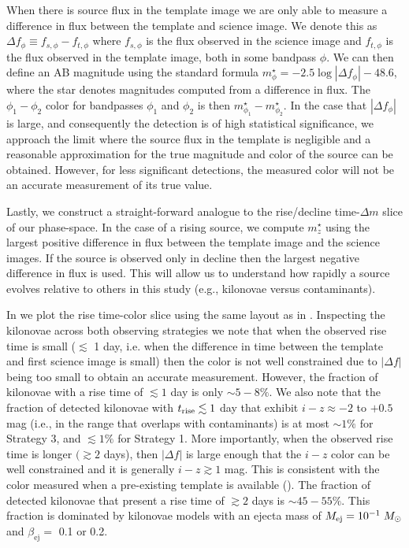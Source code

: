 \clearpage
When there is source flux in the template image we are only able to measure a difference in flux between the template and science image. We denote this as $\Delta f_{\phi} \equiv f_{s,\phi} - f_{t,\phi}$ where $f_{s,\phi}$ is the flux observed in the science image and $f_{t,\phi}$ is the flux observed in the template image, both in some bandpass $\phi$. We can then define an AB magnitude using the standard formula $m^{\star}_{\phi} = -2.5\log{|\Delta f_{\phi}|}-48.6$, where the star denotes magnitudes computed from a difference in flux. The $\phi_1 - \phi_2$ color for bandpasses $\phi_1$ and $\phi_2$ is then $m^{\star}_{\phi_1} - m^{\star}_{\phi_2}$. In the case that $|\Delta f_{\phi}|$ is large, and consequently the detection is of high statistical significance,  we approach the limit where the source flux in the template is negligible and a reasonable approximation for the true magnitude and color of the source can be obtained. However, for less significant detections, the measured color will not be an accurate measurement of its true value.

Lastly, we construct a straight-forward analogue to the rise/decline time-$\Delta m$ slice of our phase-space. In the case of a rising source, we compute $m^{\star}_z$ using the largest positive difference in flux between the template image and the science images. If the source is observed only in decline then the largest negative difference in flux is used. This will allow us to understand how rapidly a source evolves relative to others in this study (e.g., kilonovae versus contaminants).
 
In  we plot the rise time-color slice using the same layout as in . Inspecting the kilonovae across both observing strategies we note that when the observed rise time is small ($\lesssim$ 1 day, i.e. when the difference in time between the template and first science image is small) then the color is not well constrained due to $|\Delta f|$ being too small to obtain an accurate measurement. However, the fraction of kilonovae with a rise time of $\lesssim1$ day is only $\sim5-8\%$. We also note that the fraction of detected kilonovae with $t_{{\rm rise}} \lesssim 1$ day that exhibit $i-z\approx -2$ to $+0.5$ mag (i.e., in the range that overlaps with contaminants) is at most $\sim1\%$ for Strategy 3, and $\lesssim1\%$ for Strategy 1. More importantly, when the observed rise time is longer $(\gtrsim 2$ days), then $|\Delta f|$ is large enough that the $i-z$ color can be well constrained and it is generally $i-z\gtrsim1$ mag. This is consistent with the color measured when a pre-existing template is available (). The fraction of detected kilonovae that present a rise time of $\gtrsim 2$ days is $\sim45-55\%$. This fraction is dominated by kilonovae models with an ejecta mass of $M_{\rm ej} = 10^{-1} \;M_{\odot}$ and $\beta_{\text{ej}} = $ 0.1 or 0.2.

